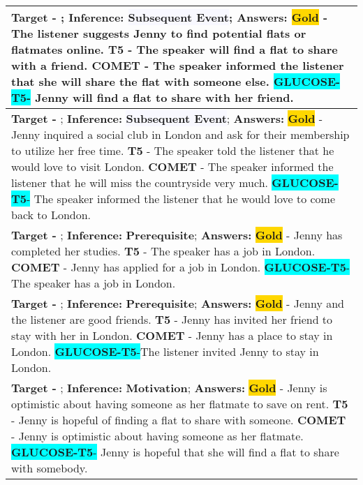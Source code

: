 \begin{table*}[ht!]
\begin{subtable}{\textwidth}
{\begin{tabular}{p{16cm}}
      \midrule
      \textbf{Target -} \pmb{}; \textbf{Inference:} \colorbox{ghostwhite}{\bf Subsequent Event}; \textbf{Answers:} \colorbox{gold}{\textbf{Gold}} - The listener suggests Jenny to find potential flats or flatmates online. \colorbox{Blue4}{\textbf{T5}} - The speaker will find a flat to share with a friend. \colorbox{brilliantlavender}{\textbf{COMET}} - The speaker informed the listener that she will share the flat with someone else. \colorbox{aqua}{\textbf{GLUCOSE-T5}-} Jenny will find a flat to share with her friend. \\
      
      \midrule
      \textbf{Target -} \pmb{}; \textbf{Inference:} \colorbox{ghostwhite}{\bf Subsequent Event}; \textbf{Answers:} \colorbox{gold}{\textbf{Gold}} - Jenny inquired a social club in London and ask for their membership to utilize her free time. \colorbox{Blue4}{\textbf{T5}} - The speaker told the listener that he would love to visit London. \colorbox{brilliantlavender}{\textbf{COMET}} - The speaker informed the listener that he will miss the countryside very much. \colorbox{aqua}{\textbf{GLUCOSE-T5}-} The speaker informed the listener that he would love to come back to London. \\
      
      \midrule
      \textbf{Target -} \pmb{}; \textbf{Inference:} \colorbox{Green2}{\bf Prerequisite}; \textbf{Answers:} \colorbox{gold}{\textbf{Gold}} - Jenny has completed her studies. \colorbox{Blue4}{\textbf{T5}} - The speaker has a job in London. \colorbox{brilliantlavender}{\textbf{COMET}} - Jenny has applied for a job in London. \colorbox{aqua}{\textbf{GLUCOSE-T5}-} The speaker has a job in London. \\
      \midrule
      \textbf{Target -} \pmb{}; \textbf{Inference:} \colorbox{Green2}{\bf Prerequisite}; \textbf{Answers:} \colorbox{gold}{\textbf{Gold}} - Jenny and the listener are good friends. \colorbox{Blue4}{\textbf{T5}} - Jenny has invited her friend to stay with her in London. \colorbox{brilliantlavender}{\textbf{COMET}} - Jenny has a place to stay in London. \colorbox{aqua}{\textbf{GLUCOSE-T5}-}The listener invited Jenny to stay in London. \\
      
      \midrule
      \textbf{Target -} \pmb{}; \textbf{Inference:} \colorbox{Blue2}{\bf Motivation}; \textbf{Answers:} \colorbox{gold}{\textbf{Gold}} - Jenny is optimistic about having someone as her flatmate to save on rent. \colorbox{Blue4}{\textbf{T5}} - Jenny is hopeful of finding a flat to share with someone. \colorbox{brilliantlavender}{\textbf{COMET}} -  Jenny is optimistic about having someone as her flatmate. \colorbox{aqua}{\textbf{GLUCOSE-T5}-} Jenny is hopeful that she will find a flat to share with somebody. \\
      

\end{tabular}}
\end{subtable}
\end{table*}
